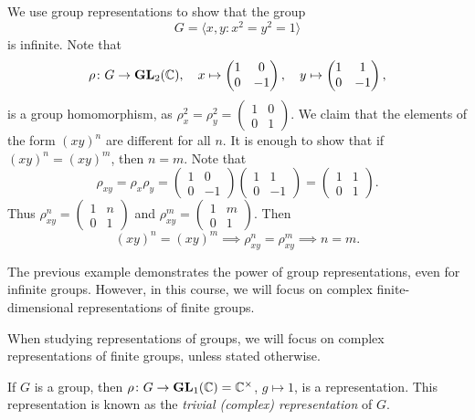 \begin{example}
	We use group representations to show that the group 
	\[
    G=\langle x,y:x^2=y^2=1\rangle
    \]
    is infinite. Note that
	\[
	\rho\colon G\to\mathbf{GL}_2(\mathbb{C}),
	\quad
	x\mapsto\begin{pmatrix}
		1&0\\
		0&-1	
	\end{pmatrix},\quad
 	y\mapsto\begin{pmatrix}
		1&1\\
		0&-1	
	\end{pmatrix},
 	\]
 	is a group homomorphism, as 
 	$\rho_x^2=\rho_y^2=\begin{pmatrix}
		1&0\\
		0&1	
	\end{pmatrix}$. We claim that the elements of the form $(xy)^n$ are
	different for all $n$. It is enough to show that if 
	$(xy)^n=(xy)^m$, then $n=m$. Note that
	\[
	\rho_{xy}=\rho_x\rho_y=\begin{pmatrix}
		1&0\\
		0&-1	
	\end{pmatrix}
	\begin{pmatrix}
		1&1\\
		0&-1	
	\end{pmatrix}
	=\begin{pmatrix}
		1&1\\
		0&1	
	\end{pmatrix}.
	\]
	Thus $\rho_{xy}^n=\begin{pmatrix}
		1&n\\
		0&1	
	\end{pmatrix}$ and 
	$\rho_{xy}^m=\begin{pmatrix}
		1&m\\
		0&1	
	\end{pmatrix}$. Then 
	\[
	(xy)^n=(xy)^m\implies\rho_{xy}^n=\rho_{xy}^m\implies n=m.
	\] 
\end{example}

The previous example demonstrates the power of group representations, even for infinite groups. 
However, in this course, we will focus on complex finite-dimensional representations of finite groups.

\begin{convention}
    When studying representations of groups, 
    we will focus on complex representations of finite groups, unless stated otherwise.
\end{convention}

\begin{example}
	If $G$ is a group, then $\rho\colon G\to\mathbf{GL}_1(\mathbb{C})=\mathbb{C}^\times$, $g\mapsto 1$, 
	is a representation. This representation is known as the \emph{trivial (complex) representation} of $G$. 	
\end{example}

